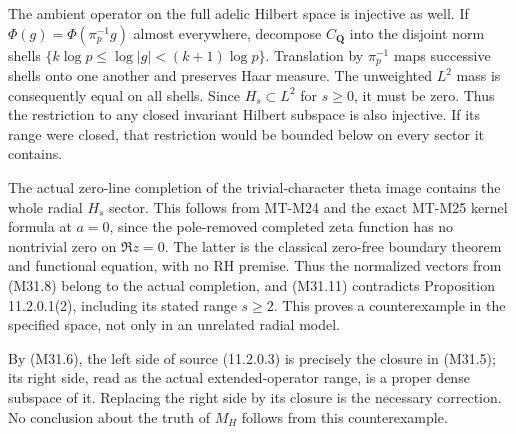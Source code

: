 The ambient operator on the full adelic Hilbert space is
injective as well.  If $\Phi(g)=\Phi(\pi_p^{-1}g)$
almost everywhere, decompose $C_{\mathbf Q}$ into the
disjoint norm shells
$\{k\log p\leq\log|g|<(k+1)\log p\}$.
Translation by $\pi_p^{-1}$ maps successive shells onto
one another and preserves Haar measure.  The unweighted
$L^2$ mass is consequently equal on all shells.  Since
$H_s\subset L^2$ for $s\geq0$, it must be zero.
Thus the restriction to any closed invariant Hilbert subspace
is also injective.  If its range were closed, that restriction
would be bounded below on every sector it contains.

The actual zero-line completion of the trivial-character
theta image contains the whole radial $H_s$ sector.
This follows from MT-M24 and the exact MT-M25 kernel formula
at $a=0$, since the pole-removed completed zeta function has
no nontrivial zero on $\Re z=0$.  The latter is the classical
zero-free boundary theorem and functional equation, with no
RH premise.  Thus the normalized vectors from (M31.8)
belong to the actual completion, and (M31.11) contradicts
Proposition 11.2.0.1(2), including its stated range $s\geq2$.
This proves a counterexample in the specified space, not only
in an unrelated radial model.

By (M31.6), the left side of source (11.2.0.3) is precisely
the closure in (M31.5); its right side, read as the actual
extended-operator range, is a proper dense subspace of it.
Replacing the right side by its closure is the necessary
correction.  No conclusion about the truth of $M_H$ follows
from this counterexample.

